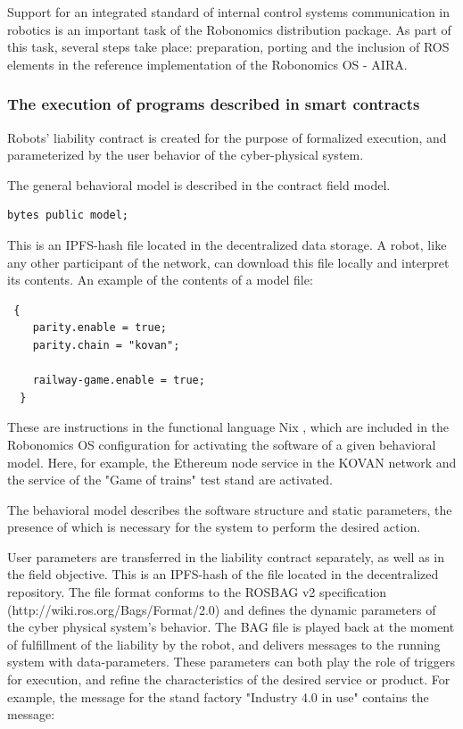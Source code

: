 \documentclass{article}
\begin{document}
Support for an integrated standard of internal control systems communication in robotics is an important task of the Robonomics distribution package. As part of this task, several steps take place: preparation, porting and the inclusion of ROS elements in the reference implementation of the Robonomics OS - AIRA.

\subsubsection{The execution of programs described in smart contracts}

Robots’ liability contract is created for the purpose of formalized execution, and parameterized by the user behavior of the cyber-physical system.

The general behavioral model is described in the contract field model.
\begin{lstlisting}
bytes public model;
\end{lstlisting}

This is an IPFS-hash file located in the decentralized data storage. A robot, like any other participant of the network, can download this file locally and interpret its contents. An example of the contents of a model file:

\begin{lstlisting}
 {
    parity.enable = true;
    parity.chain = "kovan";

    railway-game.enable = true;
  }
\end{lstlisting}

These are instructions in the functional language Nix \cite{Dolstra2010NixOS:Distribution}, which are included in the Robonomics OS configuration for activating the software of a given behavioral model. Here, for example, the Ethereum node service in the KOVAN network and the service of the "Game of trains" test stand are activated.

The behavioral model describes the software structure and static parameters, the presence of which is necessary for the system to perform the desired action.

User parameters are transferred in the liability contract separately, as well as in the field objective. This is an IPFS-hash of the file located in the decentralized repository. The file format conforms to the ROSBAG v2 specification (http://wiki.ros.org/Bags/Format/2.0) and defines the dynamic parameters of the cyber physical system’s behavior. The BAG file is played back at the moment of fulfillment of the liability by the robot, and delivers messages to the running system with data-parameters. These parameters can both play the role of triggers for execution, and refine the characteristics of the desired service or product. For example, the message for the stand factory "Industry 4.0 in use" contains the message:
\end{document}
